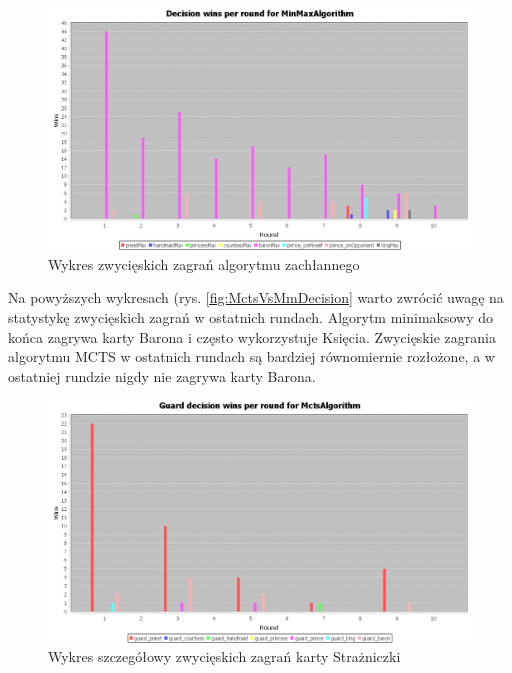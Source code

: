 \begin{figure}[H]
	\centering
	\includegraphics[width=\textwidth]{Resources/MirrorMmVsMcts/MmVsMctsDecision.PNG}
	\caption{Wykres zwycięskich zagrań algorytmu zachłannego} 
	\label{fig:MmVsMctsDecision}
\end{figure} 

Na powyższych wykresach (rys. \ref{fig:MctsVsMmDecision} warto zwrócić uwagę na statystykę zwycięskich zagrań w ostatnich rundach. Algorytm minimaksowy do końca zagrywa karty Barona i często wykorzystuje Księcia. Zwycięskie zagrania algorytmu MCTS w ostatnich rundach są bardziej równomiernie rozłożone, a w ostatniej rundzie nigdy nie zagrywa karty Barona.

\begin{figure}[H]
	\centering
	\includegraphics[width=\textwidth]{Resources/MirrorMmVsMcts/MctsVsMmGuardDecision.PNG}
	\caption{Wykres szczegółowy zwycięskich zagrań karty Strażniczki} 
	\label{fig:MctsVsMmGuardDecision}
\end{figure}

